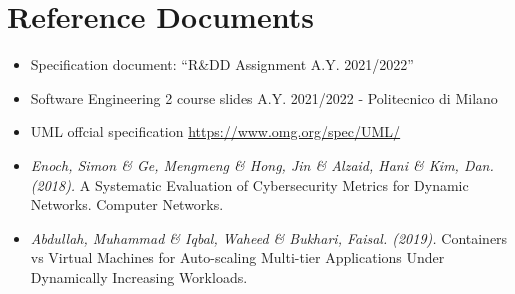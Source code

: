 \section{Reference Documents}

\begin{itemize}
    \item Specification document: “R\&DD Assignment A.Y. 2021/2022”
    \item Software Engineering 2 course slides A.Y. 2021/2022 - Politecnico di Milano
    \item UML offcial specification \url{https://www.omg.org/spec/UML/}
    \item \textit{Enoch, Simon \& Ge, Mengmeng \& Hong, Jin \& Alzaid, Hani \& Kim, Dan. (2018).} A Systematic Evaluation of Cybersecurity Metrics for Dynamic Networks. Computer Networks.
    \item \textit{Abdullah, Muhammad \& Iqbal, Waheed \& Bukhari, Faisal. (2019).} Containers vs Virtual Machines for Auto-scaling Multi-tier Applications Under Dynamically Increasing Workloads.
\end{itemize}

